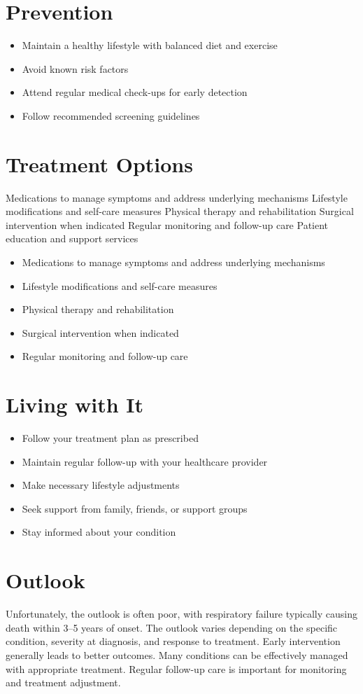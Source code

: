 \section{Prevention}
\begin{itemize}[noitemsep]
  \item Maintain a healthy lifestyle with balanced diet and exercise
  \item Avoid known risk factors
  \item Attend regular medical check-ups for early detection
  \item Follow recommended screening guidelines
\end{itemize}
\section{Treatment Options}
Medications to manage symptoms and address underlying mechanisms Lifestyle modifications and self-care measures Physical therapy and rehabilitation Surgical intervention when indicated Regular monitoring and follow-up care Patient education and support services

\begin{itemize}[noitemsep]
  \item Medications to manage symptoms and address underlying mechanisms
  \item Lifestyle modifications and self-care measures
  \item Physical therapy and rehabilitation
  \item Surgical intervention when indicated
  \item Regular monitoring and follow-up care
\end{itemize}
\section{Living with It}
\begin{itemize}[noitemsep]
  \item Follow your treatment plan as prescribed
  \item Maintain regular follow-up with your healthcare provider
  \item Make necessary lifestyle adjustments
  \item Seek support from family, friends, or support groups
  \item Stay informed about your condition
\end{itemize}
\section{Outlook}
Unfortunately, the outlook is often poor, with respiratory failure typically causing death within 3--5 years of onset. The outlook varies depending on the specific condition, severity at diagnosis, and response to treatment. Early intervention generally leads to better outcomes. Many conditions can be effectively managed with appropriate treatment. Regular follow-up care is important for monitoring and treatment adjustment.
